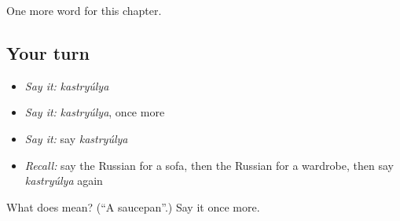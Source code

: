 \begin{grammarlens}[title={What you've built}]
One more word for this chapter.
\end{grammarlens}

\subsection*{Your turn}
\begin{itemize}
\raggedright
  \item \emph{Say it:} \emph{kastryúlya}
  \item \emph{Say it:} \emph{kastryúlya}, once more
  \item \emph{Say it:} say \emph{kastryúlya}
  \item \emph{Recall:} say the Russian for a sofa, then the Russian for a wardrobe, then say \emph{kastryúlya} again
\end{itemize}

\begin{tcolorbox}[breakable,colback=teal!4,colframe=teal!35!black,title={Before you move on}]
What does  mean? (\textquotedblleft{}A saucepan\textquotedblright{}.) Say it once more.
\end{tcolorbox}
